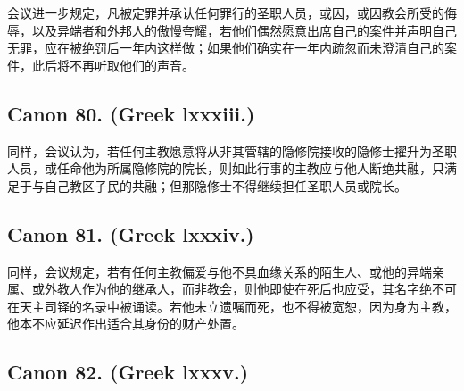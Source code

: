 \par

会议进一步规定，凡被定罪并承认任何罪行的圣职人员，或因，或因教会所受的侮辱，以及异端者和外邦人的傲慢夸耀，若他们偶然愿意出席自己的案件并声明自己无罪，应在被绝罚后一年内这样做；如果他们确实在一年内疏忽而未澄清自己的案件，此后将不再听取他们的声音。\par


\subsection{Canon 80. (Greek lxxxiii.)}

\par

同样，会议认为，若任何主教愿意将从非其管辖的隐修院接收的隐修士擢升为圣职人员，或任命他为所属隐修院的院长，则如此行事的主教应与他人断绝共融，只满足于与自己教区子民的共融；但那隐修士不得继续担任圣职人员或院长。\par


\subsection{Canon 81. (Greek lxxxiv.)}

\par

同样，会议规定，若有任何主教偏爱与他不具血缘关系的陌生人、或他的异端亲属、或外教人作为他的继承人，而非教会，则他即使在死后也应受，其名字绝不可在天主司铎的名录中被诵读。若他未立遗嘱而死，也不得被宽恕，因为身为主教，他本不应延迟作出适合其身份的财产处置。\par


\subsection{Canon 82. (Greek lxxxv.)}

